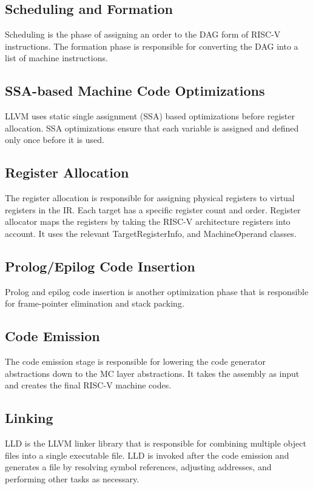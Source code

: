 \subsection{Scheduling and Formation}
Scheduling is the phase of assigning an order to the DAG form of RISC-V instructions. The formation phase is responsible for converting the DAG into a list of machine instructions.  

\subsection{SSA-based Machine Code Optimizations}
LLVM uses static single assignment (SSA) based optimizations before register allocation. SSA optimizations ensure that each variable is assigned and defined only once before it is used. 


\subsection{Register Allocation}
The register allocation is responsible for assigning physical registers to virtual registers in the IR. Each target has a specific register count and order. Register allocator maps the registers by taking the RISC-V architecture registers into account. It uses the relevant TargetRegisterInfo, and MachineOperand classes. 

\subsection{Prolog/Epilog Code Insertion}
Prolog and epilog code insertion is another optimization phase that is responsible for frame-pointer elimination and stack packing.

\subsection{Code Emission}
The code emission stage is responsible for lowering the code generator abstractions down to the MC layer abstractions. It takes the assembly as input and creates the final RISC-V machine codes. 

\subsection{Linking}
LLD is the LLVM linker library that is responsible for combining multiple object files into a single executable file. LLD is invoked after the code emission and generates a file by resolving symbol references, adjusting addresses, and performing other tasks as necessary.
